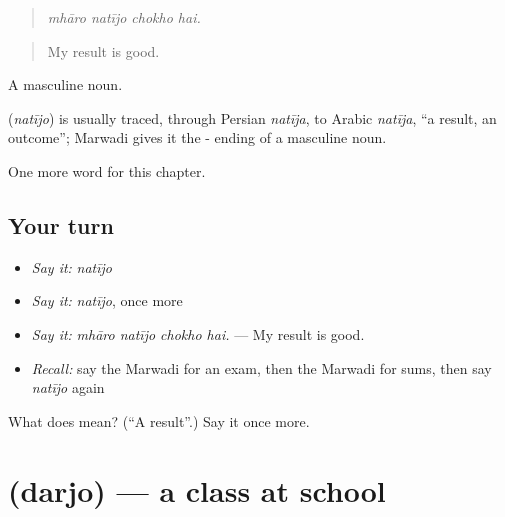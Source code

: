 \begin{quote}
   
\end{quote}

\begin{quote}
\emph{mhāro natījo chokho hai.}
\end{quote}

\begin{quote}
My result is good.
\end{quote}

A masculine noun.

\begin{cousinweb}
\textbf{} (\emph{natījo}) is usually traced, through Persian \emph{natīja}, to Arabic \emph{natīja}, \textquotedblleft{}a result, an outcome\textquotedblright{}; Marwadi gives it the - ending of a masculine noun.
\end{cousinweb}

\begin{grammarlens}[title={What you've built}]
One more word for this chapter.
\end{grammarlens}

\subsection*{Your turn}
\begin{itemize}
\raggedright
  \item \emph{Say it:} \emph{natījo}
  \item \emph{Say it:} \emph{natījo}, once more
  \item \emph{Say it:} \emph{mhāro natījo chokho hai.} — My result is good.
  \item \emph{Recall:} say the Marwadi for an exam, then the Marwadi for sums, then say \emph{natījo} again
\end{itemize}

\begin{tcolorbox}[breakable,colback=teal!4,colframe=teal!35!black,title={Before you move on}]
What does  mean? (\textquotedblleft{}A result\textquotedblright{}.) Say it once more.
\end{tcolorbox}
\section[\texorpdfstring{\mw{दरजो} (darjo)}{दरजो (darjo)}]{ (darjo) — a class at school}

\label{lesson:MW-C286-darjo}



